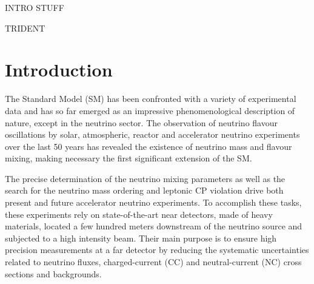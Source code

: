 INTRO STUFF

TRIDENT

\section{Introduction}
\label{sec:intro}

The Standard Model (SM) has been confronted with a variety of experimental data and has so far emerged as an impressive phenomenological description of nature, except in the neutrino sector. The observation of neutrino flavour oscillations by solar, atmospheric, reactor and accelerator neutrino experiments over the last 50 years has revealed the existence of neutrino mass and flavour mixing, making necessary the first significant extension of the SM.

The precise determination of the neutrino mixing parameters as well as the search for the neutrino mass ordering and leptonic CP violation drive both present and future accelerator neutrino experiments. To accomplish these tasks, these experiments rely on state-of-the-art near detectors, made of heavy materials, located a few hundred meters downstream of the neutrino source and subjected to a high intensity beam. Their main purpose is to ensure high precision measurements at a far detector by reducing the systematic uncertainties related to neutrino fluxes, charged-current (CC) and neutral-current (NC) cross sections and backgrounds.  
%